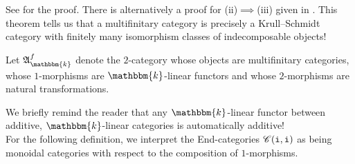 \noindent See \cite[Theorem 6.1]{Sha23} for the proof. There is alternatively a proof for (ii)$\implies$(iii) given in \cite[Lecture 1, Theorem 2]{Ela20}. This theorem tells us that a multifinitary category is precisely a Krull--Schmidt category with finitely many isomorphism classes of indecomposable objects!\\

\noindent\begin{definition} Let $\mathfrak{A}_\mathbbm{k}^f$ denote the $2$-category whose objects are multifinitary categories, whose $1$-morphisms are $\mathbbm{k}$-linear functors and whose $2$-morphisms are natural transformations.\newpage
\end{definition}

\noindent We briefly remind the reader that any $\mathbbm{k}$-linear functor between additive, $\mathbbm{k}$-linear categories is automatically additive!\\


\noindent For the following definition, we interpret the End-categories $\mathscr{C}(\textnormal{\texttt{i}}, \textnormal{\texttt{i}})$ as being monoidal categories with respect to the composition of $1$-morphisms.\\

